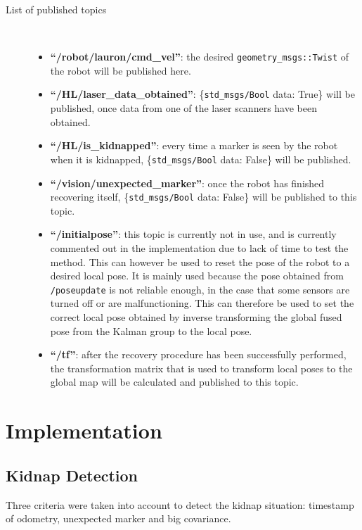 \begin{description}	
\item[List of published topics]\
	\begin{itemize}
	\item \textbf{``/robot/lauron/cmd\_vel''}: the desired \texttt{geometry_msgs::Twist} of the robot will be published here.
	\item \textbf{``/HL/laser\_data\_obtained''}: \{\texttt{std\_msgs/Bool} data: True\} will be published, once data from one of the laser scanners have been obtained.
	\item \textbf{``/HL/is\_kidnapped''}: every time a marker is seen by the robot when it is kidnapped, \{\texttt{std\_msgs/Bool} data: False\} will be published.
	\item \textbf{``/vision/unexpected\_marker''}: once the robot has finished recovering itself, \{\texttt{std\_msgs/Bool} data: False\} will be published to this topic.
	\item \textbf{``/initialpose''}: this topic is currently not in use, and is currently commented out in the implementation due to lack of time to test the method. This can however be used to reset the pose of the robot to a desired local pose. It is mainly used because the pose obtained from \texttt{/poseupdate} is not reliable enough, in the case that some sensors are turned off or are malfunctioning. This can therefore be used to set the correct local pose obtained by inverse transforming the global fused pose from the Kalman group to the local pose.
	\item \textbf{``/tf''}: after the recovery procedure has been successfully performed, the transformation matrix that is used to transform local poses to the global map will be calculated and published to this topic.
	\end{itemize}
\end{description}

\section{Implementation}\label{implementation}

\subsection{Kidnap Detection}\label{subsection:implementation_detection}
Three criteria were taken into account to detect the kidnap situation: timestamp of odometry, unexpected marker and big covariance.

